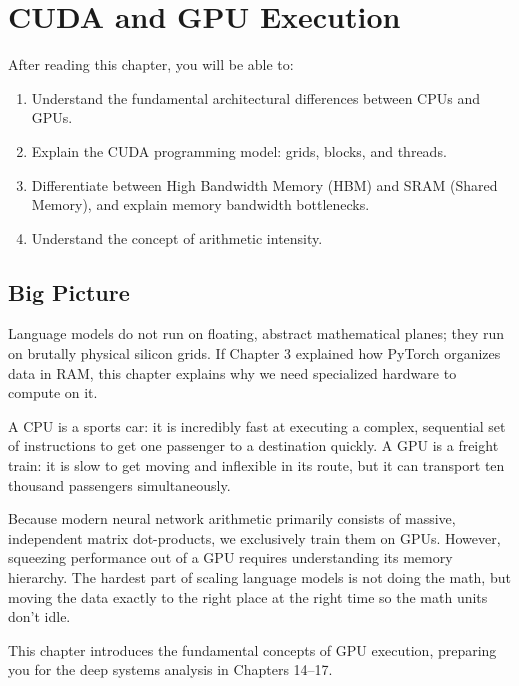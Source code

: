 \chapter{CUDA and GPU Execution}
\label{ch:04}

\begin{keyinsight}
After reading this chapter, you will be able to:
\begin{enumerate}
  \item Understand the fundamental architectural differences between CPUs and GPUs.
  \item Explain the CUDA programming model: grids, blocks, and threads.
  \item Differentiate between High Bandwidth Memory (HBM) and SRAM (Shared Memory), and explain memory bandwidth bottlenecks.
  \item Understand the concept of arithmetic intensity.
\end{enumerate}
\end{keyinsight}

\section{Big Picture}
\label{ch:04:sec:big_picture}

Language models do not run on floating, abstract mathematical planes; they run on brutally physical silicon grids. If Chapter 3 explained how PyTorch organizes data in RAM, this chapter explains why we need specialized hardware to compute on it.

A CPU is a sports car: it is incredibly fast at executing a complex, sequential set of instructions to get one passenger to a destination quickly. A GPU is a freight train: it is slow to get moving and inflexible in its route, but it can transport ten thousand passengers simultaneously. 

Because modern neural network arithmetic primarily consists of massive, independent matrix dot-products, we exclusively train them on GPUs. However, squeezing performance out of a GPU requires understanding its memory hierarchy. The hardest part of scaling language models is not doing the math, but moving the data exactly to the right place at the right time so the math units don't idle.

This chapter introduces the fundamental concepts of GPU execution, preparing you for the deep systems analysis in Chapters 14–17.

